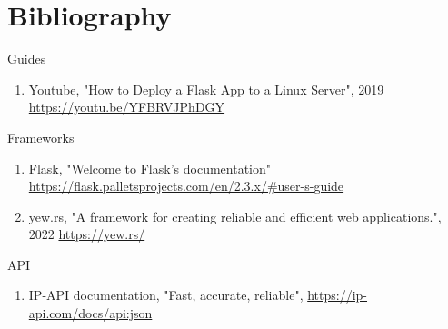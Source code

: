 \chapter*{Bibliography} 

\noindent Guides
\begin{enumerate}[noitemsep, leftmargin=0.3cm]
    \item \label{deploy-flask-app} Youtube, "How to Deploy a Flask App to a Linux Server", 2019\\
    \href{https://youtu.be/YFBRVJPhDGY}{https://youtu.be/YFBRVJPhDGY}
\end{enumerate}

\noindent Frameworks
\begin{enumerate}[noitemsep, leftmargin=0.3cm]
    \item \label{flask-docs} Flask, "Welcome to Flask’s documentation" \href{https://flask.palletsprojects.com/en/2.3.x/#user-s-guide}{https://flask.palletsprojects.com/en/2.3.x/\#user-s-guide}
    \item \label{yew-docs} yew.rs, "A framework for creating reliable and efficient web applications.", 2022 \href{https://yew.rs/}{https://yew.rs/}
\end{enumerate}

\noindent API
\begin{enumerate}[noitemsep, leftmargin=0.3cm]
    \item IP-API documentation, "Fast, accurate, reliable", \href{https://ip-api.com/docs/api:json}{https://ip-api.com/docs/api:json}
\end{enumerate}


